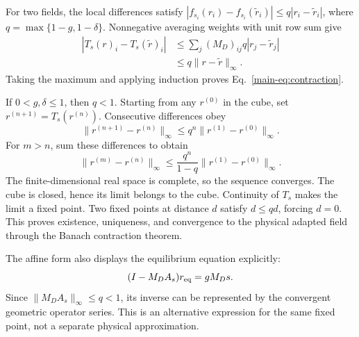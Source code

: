 For two fields, the local differences satisfy $|f_{s_i}(r_i)-f_{s_i}(\widetilde r_i)|\le q|r_i-\widetilde r_i|$, where $q=\max\{1-g,1-\delta\}$. Nonnegative averaging weights with unit row sum give
\begin{equation}
\label{eq:average}
\begin{aligned}
|T_s(r)_i-T_s(\widetilde r)_i|
&\le\sum_j (M_D)_{ij}q|r_j-\widetilde r_j|\\
&\le q\|r-\widetilde r\|_\infty.
\end{aligned}
\end{equation}
Taking the maximum and applying induction proves Eq.~\eqref{main-eq:contraction}.

If $0<g,\delta\le1$, then $q<1$. Starting from any $r^{(0)}$ in the cube, set $r^{(n+1)}=T_s(r^{(n)})$. Consecutive differences obey
\begin{equation}
\label{eq:iterate_gap}
\|r^{(n+1)}-r^{(n)}\|_\infty
\le q^n\|r^{(1)}-r^{(0)}\|_\infty.
\end{equation}
For $m>n$, sum these differences to obtain
\begin{equation}
\label{eq:cauchy}
\|r^{(m)}-r^{(n)}\|_\infty
\le\frac{q^n}{1-q}\|r^{(1)}-r^{(0)}\|_\infty.
\end{equation}
The finite-dimensional real space is complete, so the sequence converges. The cube is closed, hence its limit belongs to the cube. Continuity of $T_s$ makes the limit a fixed point. Two fixed points at distance $d$ satisfy $d\le qd$, forcing $d=0$. This proves existence, uniqueness, and convergence to the physical adapted field through the Banach contraction theorem.

The affine form also displays the equilibrium equation explicitly:
\begin{equation}
\label{eq:equilibrium_linear}
(I-M_DA_s)r_{\rm eq}=gM_Ds.
\end{equation}
Since $\|M_DA_s\|_\infty\le q<1$, its inverse can be represented by the convergent geometric operator series. This is an alternative expression for the same fixed point, not a separate physical approximation.

